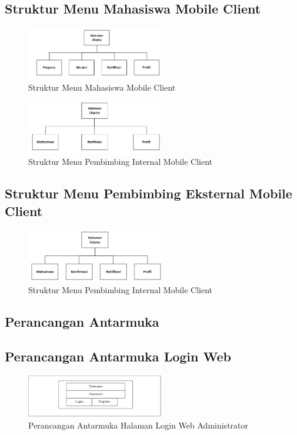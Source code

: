 \subsection{Struktur Menu Mahasiswa Mobile Client}
	\begin{figure}[H]
		\includegraphics[width=6cm]{figures/diagram/image109.PNG}
		\centering
		\caption{Struktur Menu Mahasiswa Mobile Client }
	\end{figure}
	\begin{figure}[H]
		\includegraphics[width=6cm]{figures/diagram/image110.PNG}
		\centering
		\caption{Struktur Menu Pembimbing Internal Mobile Client }
	\end{figure}

\subsection{Struktur Menu Pembimbing Eksternal Mobile Client}
	\begin{figure}[H]
		\includegraphics[width=6cm]{figures/diagram/image111.PNG}
		\centering
		\caption{Struktur Menu Pembimbing Internal Mobile Client }
	\end{figure}

\subsection{Perancangan Antarmuka}
\subsection{Perancangan Antarmuka Login Web}
	\begin{figure}[H]
		\includegraphics[width=6cm]{figures/diagram/image112.png}
		\centering
		\caption{Perancangan Antarmuka Halaman Login Web Administrator }
	\end{figure}

